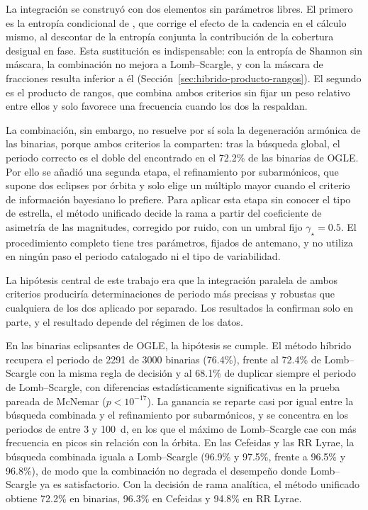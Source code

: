 \documentclass[12pt,letterpaper,oneside]{book}
\begin{document}
La integraci\'on se construy\'o con dos elementos sin par\'ametros libres. El primero es la entrop\'ia condicional de \citet{Graham2013b}, que corrige el efecto de la cadencia en el c\'alculo mismo, al descontar de la entrop\'ia conjunta la contribuci\'on de la cobertura desigual en fase. Esta sustituci\'on es indispensable: con la entrop\'ia de Shannon sin m\'ascara, la combinaci\'on no mejora a Lomb--Scargle, y con la m\'ascara de fracciones resulta inferior a \'el (Secci\'on~\ref{sec:hibrido-producto-rangos}). El segundo es el producto de rangos, que combina ambos criterios sin fijar un peso relativo entre ellos y solo favorece una frecuencia cuando los dos la respaldan.

La combinaci\'on, sin embargo, no resuelve por s\'i sola la degeneraci\'on arm\'onica de las binarias, porque ambos criterios la comparten: tras la b\'usqueda global, el periodo correcto es el doble del encontrado en el 72.2\% de las binarias de OGLE. Por ello se a\~nadi\'o una segunda etapa, el refinamiento por subarm\'onicos, que supone dos eclipses por \'orbita y solo elige un m\'ultiplo mayor cuando el criterio de informaci\'on bayesiano lo prefiere. Para aplicar esta etapa sin conocer el tipo de estrella, el m\'etodo unificado decide la rama a partir del coeficiente de asimetr\'ia de las magnitudes, corregido por ruido, con un umbral fijo $\gamma_\star=0.5$. El procedimiento completo tiene tres par\'ametros, fijados de antemano, y no utiliza en ning\'un paso el periodo catalogado ni el tipo de variabilidad.

La hip\'otesis central de este trabajo era que la integraci\'on paralela de ambos criterios producir\'ia determinaciones de periodo m\'as precisas y robustas que cualquiera de los dos aplicado por separado. Los resultados la confirman solo en parte, y el resultado depende del r\'egimen de los datos.

En las binarias eclipsantes de OGLE, la hip\'otesis se cumple. El m\'etodo h\'ibrido recupera el periodo de 2291 de 3000 binarias (76.4\%), frente al 72.4\% de Lomb--Scargle con la misma regla de decisi\'on y al 68.1\% de duplicar siempre el periodo de Lomb--Scargle, con diferencias estad\'isticamente significativas en la prueba pareada de McNemar ($p<10^{-17}$). La ganancia se reparte casi por igual entre la b\'usqueda combinada y el refinamiento por subarm\'onicos, y se concentra en los periodos de entre 3 y 100~d, en los que el m\'aximo de Lomb--Scargle cae con m\'as frecuencia en picos sin relaci\'on con la \'orbita. En las Cefeidas y las RR Lyrae, la b\'usqueda combinada iguala a Lomb--Scargle (96.9\% y 97.5\%, frente a 96.5\% y 96.8\%), de modo que la combinaci\'on no degrada el desempe\~no donde Lomb--Scargle ya es satisfactorio. Con la decisi\'on de rama anal\'itica, el m\'etodo unificado obtiene 72.2\% en binarias, 96.3\% en Cefeidas y 94.8\% en RR Lyrae.
\end{document}
